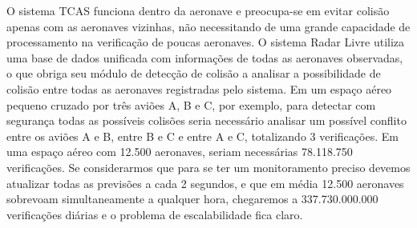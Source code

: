 O sistema TCAS funciona dentro da aeronave e preocupa-se em evitar colisão apenas com as aeronaves vizinhas, não necessitando de uma grande capacidade de processamento na verificação de poucas aeronaves. O sistema Radar Livre utiliza uma base de dados unificada com informações de todas as aeronaves observadas, o que obriga seu módulo de detecção de colisão a analisar a possibilidade de colisão entre todas as aeronaves registradas pelo sistema. Em um espaço aéreo pequeno cruzado por três aviões A, B e C, por exemplo, para detectar com segurança todas as possíveis colisões seria necessário analisar um possível conflito entre os aviões A e B, entre B e C e entre A e C, totalizando 3 verificações. Em uma espaço aéreo com 12.500 aeronaves, seriam necessárias 78.118.750 verificações. Se considerarmos que para se ter um monitoramento preciso devemos atualizar todas as previsões a cada 2 segundos, e que em média 12.500 aeronaves sobrevoam simultaneamente a qualquer hora, chegaremos a 337.730.000.000 verificações diárias e o problema de escalabilidade fica claro.

